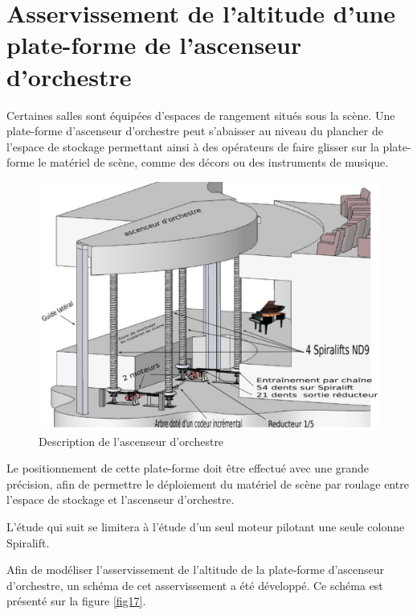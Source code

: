 


\section{Asservissement de l'altitude d'une plate-forme de l'ascenseur d'orchestre}

Certaines salles sont équipées d'espaces de rangement situés sous la scène. Une plate-forme d'ascenseur d'orchestre peut s'abaisser au niveau du plancher de l'espace de stockage permettant ainsi à des opérateurs de faire glisser sur la plate-forme le matériel de scène, comme des décors ou des instruments de musique.

\begin{figure}[!h]
 \centering\includegraphics[width=0.7\linewidth]{img/fig16}
 \caption{Description de l'ascenseur d'orchestre}
 \label{fig16}
\end{figure}

Le positionnement de cette plate-forme doit être effectué avec une grande précision, afin de permettre le déploiement du matériel de scène par roulage entre l'espace de stockage et l'ascenseur d'orchestre.

L'étude qui suit se limitera à l'étude d'un seul moteur pilotant une seule colonne Spiralift.

Afin de modéliser l'asservissement de l'altitude de la plate-forme d'ascenseur d'orchestre, un schéma de cet asservissement a été développé. Ce schéma est présenté sur la figure \ref{fig17}.

